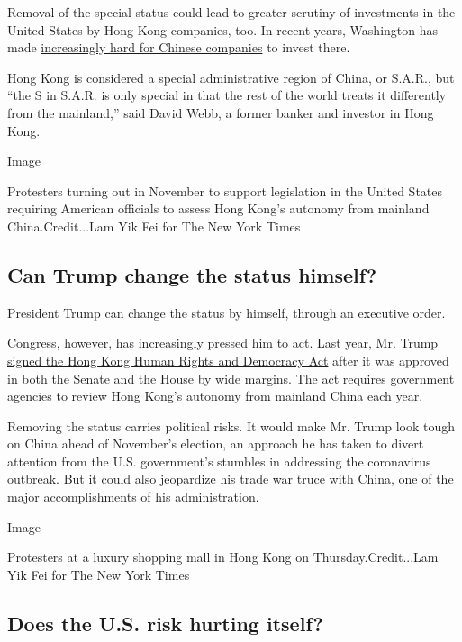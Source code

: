 Removal of the special status could lead to greater scrutiny of
investments in the United States by Hong Kong companies, too. In recent
years, Washington has made
\href{https://www.nytimes3xbfgragh.onion/2019/09/17/us/politics/china-foreign-investment-cfius.html}{increasingly
hard for Chinese companies} to invest there.

Hong Kong is considered a special administrative region of China, or
S.A.R., but ``the S in S.A.R. is only special in that the rest of the
world treats it differently from the mainland,'' said David Webb, a
former banker and investor in Hong Kong.

Image

Protesters turning out in November to support legislation in the United
States requiring American officials to assess Hong Kong's autonomy from
mainland China.Credit...Lam Yik Fei for The New York Times

\hypertarget{can-trump-change-the-status-himself}{%
\subsection{Can Trump change the status
himself?}\label{can-trump-change-the-status-himself}}

President Trump can change the status by himself, through an executive
order.

Congress, however, has increasingly pressed him to act. Last year, Mr.
Trump
\href{https://www.nytimes3xbfgragh.onion/2019/11/27/us/politics/trump-hong-kong.html}{signed
the Hong Kong Human Rights and Democracy Act} after it was approved in
both the Senate and the House by wide margins. The act requires
government agencies to review Hong Kong's autonomy from mainland China
each year.

Removing the status carries political risks. It would make Mr. Trump
look tough on China ahead of November's election, an approach he has
taken to divert attention from the U.S. government's stumbles in
addressing the coronavirus outbreak. But it could also jeopardize his
trade war truce with China, one of the major accomplishments of his
administration.

Image

Protesters at a luxury shopping mall in Hong Kong on
Thursday.Credit...Lam Yik Fei for The New York Times

\hypertarget{does-the-us-risk-hurting-itself}{%
\subsection{Does the U.S. risk hurting
itself?}\label{does-the-us-risk-hurting-itself}}

